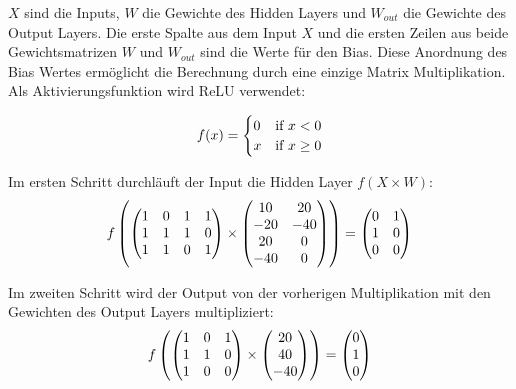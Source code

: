 $ X $ sind die Inputs, $ W $ die Gewichte des Hidden Layers und $ W_{out} $ die Gewichte des Output Layers.
Die erste Spalte aus dem Input $ X $ und die ersten Zeilen aus beide Gewichtsmatrizen $ W $ und $ W_{out} $ sind die Werte für den Bias.
Diese Anordnung des Bias Wertes ermöglicht die Berechnung durch eine einzige Matrix Multiplikation. Als Aktivierungsfunktion wird ReLU
\cite{10.5555/3104322.3104425} verwendet:

\begin{equation}
  \vspace{5pt}
  f(x) =
  \begin{cases}
    0 & \text{if \(x < 0\)}    \\
    x & \text{if \(x \geq 0\)}
  \end{cases}
\end{equation}

Im ersten Schritt durchläuft der Input die Hidden Layer $ f(X \times W) $:
\begin{equation}
  \vspace{5pt}
  f \left(
  \begin{pmatrix}
      1 & 0 & 1 & 1 \\
      1 & 1 & 1 & 0 \\
      1 & 1 & 0 & 1
    \end{pmatrix}
  \times
  \begin{pmatrix}
      10  & 20  \\
      -20 & -40 \\
      20  & 0   \\
      -40 & 0
    \end{pmatrix}
  \right)
  =
  \begin{pmatrix}
    0 & 1 \\
    1 & 0 \\
    0 & 0
  \end{pmatrix}
\end{equation}

Im zweiten Schritt wird der Output von der vorherigen Multiplikation mit den Gewichten des Output Layers multipliziert:
\begin{equation}
  \vspace{5pt}
  f \left(
  \begin{pmatrix}
      1 & 0 & 1 \\
      1 & 1 & 0 \\
      1 & 0 & 0
    \end{pmatrix}
  \times
  \begin{pmatrix}
      20 \\
      40 \\
      -40
    \end{pmatrix}
  \right)
  =
  \begin{pmatrix}
    0 \\
    1 \\
    0
  \end{pmatrix}
\end{equation}

